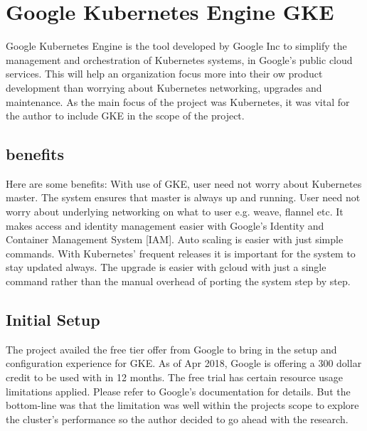 \section{ Google Kubernetes Engine GKE}

Google Kubernetes Engine is the tool developed by Google Inc to simplify the 
management and orchestration of Kubernetes systems, in Google's public cloud
 services. This will help an organization focus more into their ow product 
 development than worrying about Kubernetes networking, upgrades and 
 maintenance. As the main focus of the project was Kubernetes, it
was vital for the author to include GKE in the scope of the project.

\subsection{benefits}

Here are some benefits: With use of GKE, user need not worry about Kubernetes
 master. The system ensures that master is always up and running. User need not
  worry about underlying networking on what to user e.g. weave, flannel etc. 
  It makes access and identity management easier with Google's Identity and 
  Container Management System [IAM]. Auto scaling is easier with just simple 
  commands. With Kubernetes' frequent releases it is important for the system 
to stay updated always. The upgrade is easier with gcloud with just a single 
command rather than the manual overhead of porting the system step by step.

\subsection{Initial Setup}
The project availed the free tier offer from Google to bring in the setup and 
configuration experience for GKE. As of Apr 2018, Google is offering a 300 
dollar credit to be used with in 12 months. The free trial has certain resource
usage limitations applied. Please refer to Google's documentation for details.
 But the bottom-line was that the limitation was well within the projects scope
  to explore the cluster's performance so the author decided to go ahead with 
  the research. 

